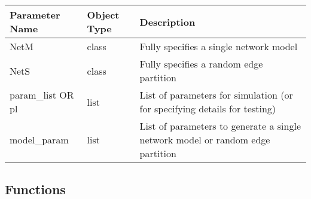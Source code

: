 \documentclass[11pt]{article}
\begin{document}
\begin{tabular}{|l|l|p{8cm}|} \hline
{\bf Parameter Name} & {\bf Object Type} & {\bf Description} \\ 
\hline
NetM & class & Fully specifies a single network model \\ \hline
NetS & class & Fully specifies a random edge partition \\ \hline
param\_list OR pl & list & List of parameters for simulation (or for specifying details for testing) \\ \hline
model\_param & list & List of parameters to generate a single network model or random edge partition\\ \hline 
\end{tabular}




\subsection{Functions}
\end{document}

